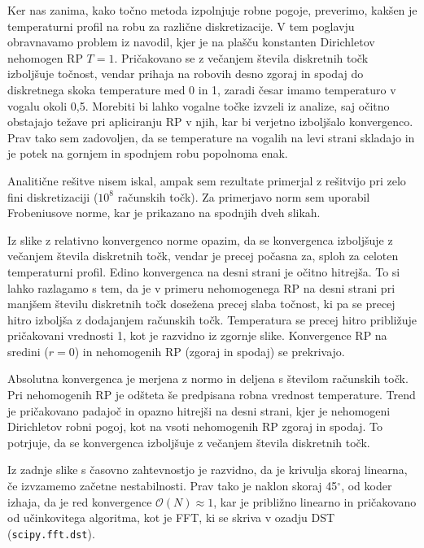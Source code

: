Ker nas zanima, kako točno metoda izpolnjuje robne pogoje, preverimo, kakšen je temperaturni profil na robu za različne diskretizacije. V tem poglavju obravnavamo problem iz navodil, kjer je na plašču konstanten Dirichletov nehomogen RP $T=1$. Pričakovano se z večanjem števila diskretnih točk izboljšuje točnost, vendar prihaja na robovih desno zgoraj in spodaj do diskretnega skoka temperature med 0 in 1, zaradi česar imamo temperaturo v vogalu okoli 0,5. Morebiti bi lahko vogalne točke izvzeli iz analize, saj očitno obstajajo težave pri apliciranju RP v njih, kar bi verjetno izboljšalo konvergenco. Prav tako sem zadovoljen, da se temperature na vogalih na levi strani skladajo in je potek na gornjem in spodnjem robu popolnoma enak.


Analitične rešitve nisem iskal, ampak sem rezultate primerjal z rešitvijo pri zelo fini diskretizaciji ($10^8$ računskih točk). Za primerjavo norm sem uporabil Frobeniusove norme, kar je prikazano na spodnjih dveh slikah.

Iz slike z relativno konvergenco norme opazim, da se konvergenca izboljšuje z večanjem števila diskretnih točk, vendar je precej počasna za, sploh za celoten temperaturni profil. Edino konvergenca na desni strani je očitno hitrejša. To si lahko razlagamo s tem, da je v primeru nehomogenega RP na desni strani pri manjšem številu diskretnih točk dosežena precej slaba točnost, ki pa se precej hitro izboljša z dodajanjem računskih točk. Temperatura se precej hitro približuje pričakovani vrednosti 1, kot je razvidno iz zgornje slike. Konvergence RP na sredini ($r=0$) in nehomogenih RP (zgoraj in spodaj) se prekrivajo.


Absolutna konvergenca je merjena z normo in deljena s številom računskih točk. Pri nehomogenih RP je odšteta še predpisana robna vrednost temperature. Trend je pričakovano padajoč in opazno hitrejši na desni strani, kjer je nehomogeni Dirichletov robni pogoj, kot na vsoti nehomogenih RP zgoraj in spodaj. To potrjuje, da se konvergenca izboljšuje z večanjem števila diskretnih točk.



Iz zadnje slike s časovno zahtevnostjo je razvidno, da je krivulja skoraj linearna, če izvzamemo začetne nestabilnosti. Prav tako je naklon skoraj 45$^\circ$, od koder izhaja, da je red konvergence $\mathcal{O}(N) \approx 1$, kar je približno linearno in pričakovano od učinkovitega algoritma, kot je FFT, ki se skriva v ozadju DST (\texttt{scipy.fft.dst}).